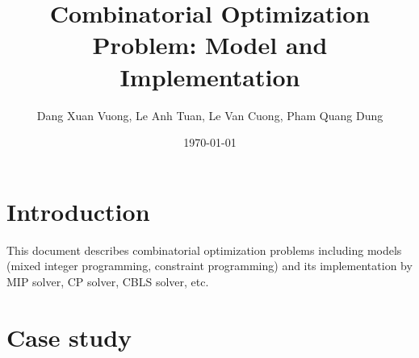 \documentclass[11pt]{book}
\title{\bf Combinatorial Optimization Problem: Model and Implementation}    %
\author{Dang Xuan Vuong, Le Anh Tuan, Le Van Cuong, Pham Quang Dung}              %
\date{\today}                           %
\begin{document}
\frontmatter                            %
\maketitle                              %
\tableofcontents                        %
\mainmatter                             %

\chapter{Introduction}
This document describes combinatorial optimization problems including models (mixed integer programming, constraint programming) and its implementation by MIP solver, CP solver, CBLS solver, etc. 
\chapter{Case study} 
 
\end{document}
